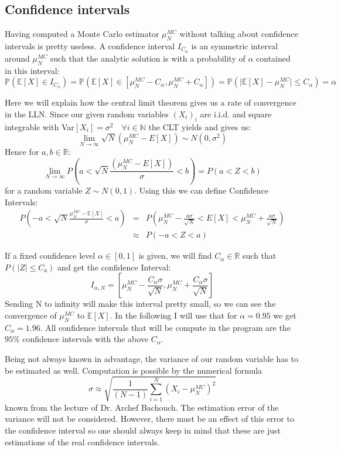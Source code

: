 \documentclass[12pt,a4paper]{scrartcl}
\begin{document}
\subsection{Confidence intervals}
Having computed a Monte Carlo estimator $\mu^{MC}_N$ without talking about confidence intervals is pretty useless. A confidence interval $I_{C_\alpha}$ is an symmetric interval around $\mu^{MC}_N$  such that the analytic solution is with a probability of $\alpha$ contained in this interval:
\[
\mathbb{P} \left( \mathbb{E} \left[ X \right] \in I_{C_{\alpha}} \right) = 
\mathbb{P} \left( \mathbb{E} \left[ X \right] \in \left[\mu^{MC}_N - C_\alpha , \mu^{MC}_N + C_\alpha \right] \right) = 
\mathbb{P} \left( \mid \mathbb{E} \left[ X \right] - \mu^{MC}_N \mid \leq C_\alpha \right) = \alpha
\]

\noindent Here we will explain how the central limit theorem gives us a rate of convergence in the LLN. 
Since our given random variables $(X_i)_i$ are i.i.d. and square integrable with Var$\left[X_i \right] = \sigma^2 \quad  \forall i \in \mathbb{N}$ the CLT yields and gives us:
\[
\lim_{N\rightarrow \infty} \sqrt{N} ( \mu^{MC}_N - E\left[ X\right]) \sim  N(0,\sigma^2) 
\]  
Hence for $a,b \in \mathbb{R}$:
\[
\lim_{N\rightarrow \infty} 
P(a< \sqrt{N} \frac{( \mu^{MC}_N - E\left[ X\right])}{\sigma}<b)
=
P(a<Z<b)  
\]
for a random variable $ Z \sim N(0,1) $. Using this we can define Confidence Intervals:
\begin{eqnarray*}
P(-a< \sqrt{N} \frac{ \mu^{MC}_N - \mathbb{E} \left[ X \right]}{\sigma} <a)
& = &
P \left( \mu^{MC}_N - \frac{a \sigma}{\sqrt{N}}   < E\left[ X \right] < \mu^{MC}_N + \frac{a \sigma}{\sqrt{N}}\right) \\
& \approx &
P(-a<Z<a)
\end{eqnarray*} 

\noindent If a fixed confidence level $\alpha \in \left[ 0,1 \right]$ is given, we will find $C_{\alpha} \in \mathbb{R}$ such that $P(|Z| \leq C_{a})$ and get the confidence Interval: 
\[
I_{\alpha , N} = 
\left[\mu^{MC}_N - \frac{C_{\alpha} \sigma}{\sqrt{N}}, \mu^{MC}_N + \frac{C_{\alpha} \sigma}{\sqrt{N}} \right] 
\]
Sending N to infinity will make this interval pretty small, so we can see the convergence of $\mu^{MC}_N$ to $\mathbb{E} \left[ X \right]$. In the following I will use that for $\alpha = 0.95$ we get $C_\alpha = 1.96$. All confidence intervals that will be compute in the program are the $95 \% $ confidence intervals with the above $C_\alpha $.

Being not always known in advantage, the variance of our random variable has to be estimated as well. Computation is possible by the numerical formula \[ \sigma \approx \sqrt{\frac{1}{(N-1)}\sum_{i=1}^N (X_i-\mu_N^{MC})^2}\] known from the lecture of Dr. Archef Bachouch. The estimation error of the variance will not be considered. However, there must be an effect of this error to the confidence interval so one should always keep in mind that these are just estimations of the real confidence intervals.
\end{document}
